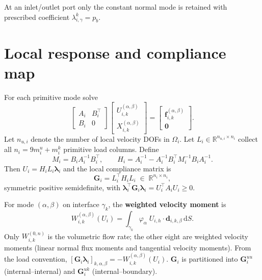 \documentclass[11pt,a4paper]{article}
\newcommand{\R}{\mathbb{R}}
\newcommand{\pore}[1]{\Omega_{#1}}
\newcommand{\iface}{\gamma}
\newcommand{\trac}{\bm{\lambda}}
\newcommand{\DtN}{\mathbf{G}}
\newcommand{\zero}{\bm{0}}
\newcommand{\loadvec}{\bm{f}}
\begin{document}
At an inlet/outlet port only the constant normal mode is retained with
prescribed coefficient $\lambda_{i,\gamma}^k = p_b$.

\section{Local response and compliance map}

For each primitive mode solve
\begin{equation}\label{eq:response}
  \begin{bmatrix} A_i & B_i^\top \\ B_i & 0 \end{bmatrix}
  \begin{bmatrix} U_{i,k}^{(\alpha,\beta)} \\
                   X_{i,k}^{(\alpha,\beta)} \end{bmatrix}
  = \begin{bmatrix} \loadvec_{i,k}^{(\alpha,\beta)} \\ \zero \end{bmatrix}.
\end{equation}
Let $n_{u,i}$ denote the number of local velocity DOFs in $\pore{i}$.
Let $L_i \in \R^{n_{u,i}\times n_i}$ collect all $n_i = 9m_i^u + m_i^k$
primitive load columns.  Define
\begin{equation}\label{eq:H}
  M_i = B_i A_i^{-1} B_i^\top,\qquad
  H_i = A_i^{-1} - A_i^{-1}B_i^\top M_i^{-1} B_i A_i^{-1}.
\end{equation}
Then $U_i = H_i L_i \trac_i$ and the local compliance matrix is
\begin{equation}\label{eq:G}
  \DtN_i = L_i^\top H_i L_i \;\in\; \R^{n_i\times n_i},
\end{equation}
symmetric positive semidefinite, with
$\trac_i^\top \DtN_i \trac_i = U_i^\top A_i U_i \ge 0$.

For mode $(\alpha,\beta)$ on interface $\iface_k$, the \textbf{weighted
velocity moment} is
\begin{equation}\label{eq:moment}
  W_{i,k}^{(\alpha,\beta)}(U_i)
  = \int_{\iface_k} \varphi_\alpha\;
    U_{i,h}\cdot\bm{d}_{i,k,\beta}\,\mathrm{d}S.
\end{equation}
Only $W_{i,k}^{(0,n)}$ is the volumetric flow rate; the other eight are
weighted velocity moments (linear normal flux moments and tangential
velocity moments).  From the load convention,
$[\DtN_i\trac_i]_{k,\alpha,\beta} = -W_{i,k}^{(\alpha,\beta)}(U_i)$.
$\DtN_i$ is partitioned into $\DtN_i^{uu}$ (internal--internal) and
$\DtN_i^{uk}$ (internal--boundary).
\end{document}
